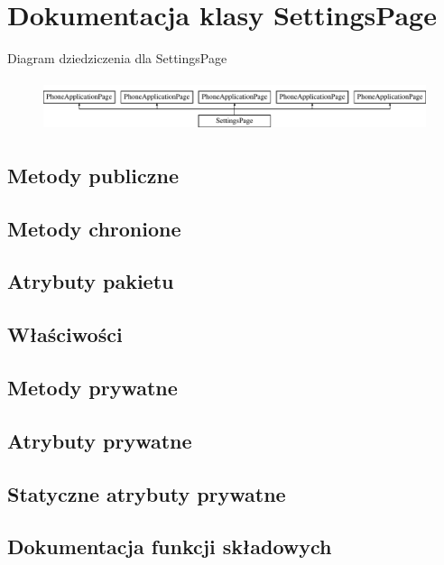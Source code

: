 \hypertarget{a00056}{}\section{Dokumentacja klasy Settings\+Page}
\label{a00056}
Diagram dziedziczenia dla Settings\+Page\begin{figure}[H]
\begin{center}
\leavevmode
\includegraphics[height=1.513514cm]{d9/d2e/a00056}
\end{center}
\end{figure}
\subsection*{Metody publiczne}
\subsection*{Metody chronione}
\subsection*{Atrybuty pakietu}
\subsection*{Właściwości}
\subsection*{Metody prywatne}
\subsection*{Atrybuty prywatne}
\subsection*{Statyczne atrybuty prywatne}


\subsection{Dokumentacja funkcji składowych}
\hypertarget{a00056_a96a31300f7d600ef564a25a5ec3244e6}{}
